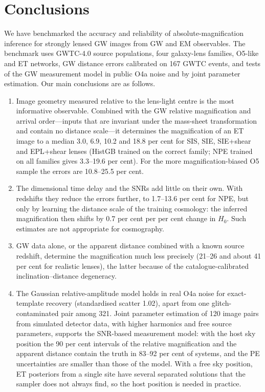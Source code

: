 \section{Conclusions}
\label{sec:conclusions}
We have benchmarked the accuracy and reliability of absolute-magnification inference for strongly lensed GW images from GW and EM observables. The benchmark uses GWTC-4.0 source populations, four galaxy-lens families, O5-like and ET networks, GW distance errors calibrated on 167 GWTC events, and tests of the GW measurement model in public O4a noise and by joint parameter estimation. Our main conclusions are as follows.
\begin{enumerate}
\item Image geometry measured relative to the lens-light centre is the most informative observable. Combined with the GW relative magnification and arrival order---inputs that are invariant under the mass-sheet transformation and contain no distance scale---it determines the magnification of an ET image to a median 3.0, 6.9, 10.2 and 18.8 per cent for SIS, SIE, SIE+shear and EPL+shear lenses (HistGB trained on the correct family; NPE trained on all families gives 3.3--19.6 per cent). For the more magnification-biased O5 sample the errors are 10.8--25.5 per cent.
\item The dimensional time delay and the SNRs add little on their own. With redshifts they reduce the errors further, to 1.7--13.6 per cent for NPE, but only by learning the distance scale of the training cosmology: the inferred magnification then shifts by 0.7 per cent per per cent change in $H_0$. Such estimates are not appropriate for cosmography.
\item GW data alone, or the apparent distance combined with a known source redshift, determine the magnification much less precisely (21--26 and about 41 per cent for realistic lenses), the latter because of the catalogue-calibrated inclination--distance degeneracy.
\item The Gaussian relative-amplitude model holds in real O4a noise for exact-template recovery (standardised scatter 1.02), apart from one glitch-contaminated pair among 321. Joint parameter estimation of 120 image pairs from simulated detector data, with higher harmonics and free source parameters, supports the SNR-based measurement model: with the host sky position the 90 per cent intervals of the relative magnification and the apparent distance contain the truth in 83--92 per cent of systems, and the PE uncertainties are smaller than those of the model. With a free sky position, ET posteriors from a single site have several separated solutions that the sampler does not always find, so the host position is needed in practice.

\end{enumerate}
